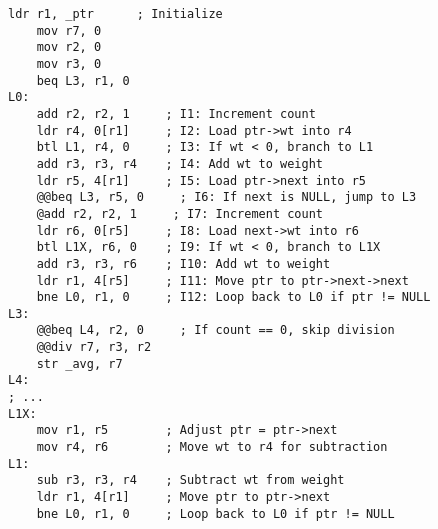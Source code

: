 \begin{lstlisting}[style=AsmStyle]
    ldr r1, _ptr      ; Initialize
    mov r7, 0         
    mov r2, 0         
    mov r3, 0         
    beq L3, r1, 0     
L0:
    add r2, r2, 1     ; I1: Increment count
    ldr r4, 0[r1]     ; I2: Load ptr->wt into r4
    btl L1, r4, 0     ; I3: If wt < 0, branch to L1
    add r3, r3, r4    ; I4: Add wt to weight
    ldr r5, 4[r1]     ; I5: Load ptr->next into r5
    @@beq L3, r5, 0     ; I6: If next is NULL, jump to L3
    @add r2, r2, 1     ; I7: Increment count
    ldr r6, 0[r5]     ; I8: Load next->wt into r6
    btl L1X, r6, 0    ; I9: If wt < 0, branch to L1X
    add r3, r3, r6    ; I10: Add wt to weight
    ldr r1, 4[r5]     ; I11: Move ptr to ptr->next->next
    bne L0, r1, 0     ; I12: Loop back to L0 if ptr != NULL
L3:
    @@beq L4, r2, 0     ; If count == 0, skip division
    @@div r7, r3, r2
    str _avg, r7      
L4:
; ...
L1X:
    mov r1, r5        ; Adjust ptr = ptr->next
    mov r4, r6        ; Move wt to r4 for subtraction
L1: 
    sub r3, r3, r4    ; Subtract wt from weight
    ldr r1, 4[r1]     ; Move ptr to ptr->next
    bne L0, r1, 0     ; Loop back to L0 if ptr != NULL
\end{lstlisting}
